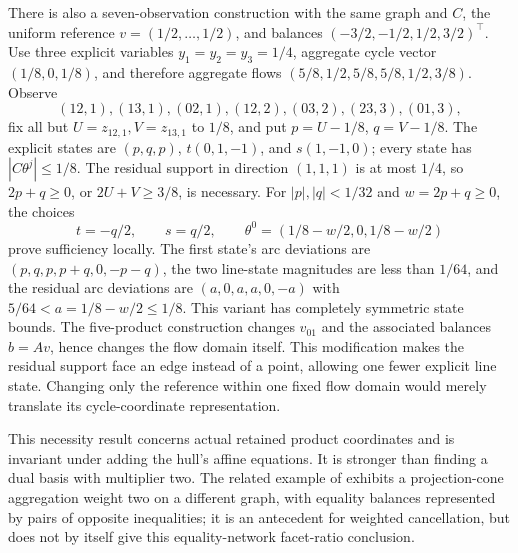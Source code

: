 \begin{remark}\label{rem:seven-product-k4}
There is also a seven-observation construction with the same graph and
$C$, the uniform reference $v=(1/2,\ldots,1/2)$, and balances
$(-3/2,-1/2,1/2,3/2)^\top$. Use three explicit variables
$y_1=y_2=y_3=1/4$, aggregate cycle vector $(1/8,0,1/8)$, and therefore
aggregate flows $(5/8,1/2,5/8,5/8,1/2,3/8)$. Observe
\[
 (12,1),(13,1),(02,1),(12,2),(03,2),(23,3),(01,3),
\]
fix all but $U=z_{12,1},V=z_{13,1}$ to $1/8$, and put
$p=U-1/8$, $q=V-1/8$. The explicit states are
$(p,q,p)$, $t(0,1,-1)$, and $s(1,-1,0)$; every state has
$|C\theta^j|\le1/8$. The residual support in direction $(1,1,1)$
is at most $1/4$, so $2p+q\ge0$, or $2U+V\ge3/8$, is necessary.
For $|p|,|q|<1/32$ and $w=2p+q\ge0$, the choices
\[
 t=-q/2,\qquad s=q/2,\qquad
 \theta^0=(1/8-w/2,0,1/8-w/2)
\]
prove sufficiency locally. The first state's arc deviations are
$(p,q,p,p+q,0,-p-q)$, the two line-state magnitudes are less than
$1/64$, and the residual arc deviations are $(a,0,a,a,0,-a)$ with
$5/64<a=1/8-w/2\le1/8$. This variant has completely symmetric state
bounds. The five-product construction changes $v_{01}$ and the associated
balances $b=Av$, hence changes the flow domain itself. This modification makes
the residual support face an edge instead of a point, allowing one fewer
explicit line state. Changing only the reference within one fixed flow domain
would merely translate its cycle-coordinate representation.
\end{remark}

This necessity result concerns actual retained product coordinates and is
invariant under adding the hull's affine equations. It is stronger than
finding a dual basis with multiplier two. The related example of
\citet[Example~2]{KhademniaDavarnia2025} exhibits a projection-cone
aggregation weight two on a different graph, with equality balances represented
by pairs of opposite inequalities;
it is an antecedent for weighted cancellation, but does not by itself
give this equality-network facet-ratio conclusion.
